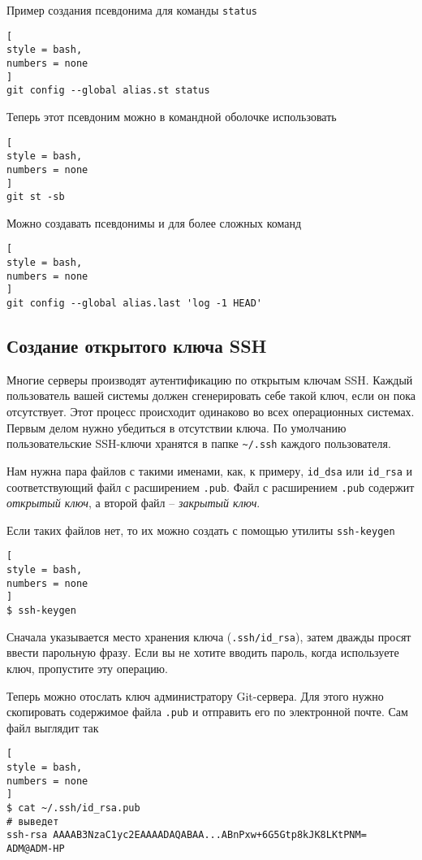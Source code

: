 \documentclass[%
	11pt,
	a4paper,
	utf8,
		]{article}
\begin{document}
Пример создания псевдонима для команды \texttt{status}
\begin{lstlisting}[
style = bash,
numbers = none
]
git config --global alias.st status
\end{lstlisting}

Теперь этот псевдоним можно в командной оболочке использовать
\begin{lstlisting}[
style = bash,
numbers = none
]
git st -sb
\end{lstlisting}

Можно создавать псевдонимы и для более сложных команд
\begin{lstlisting}[
style = bash,
numbers = none
]
git config --global alias.last 'log -1 HEAD'
\end{lstlisting}

\subsection{Создание открытого ключа SSH}

Многие серверы производят аутентификацию по открытым ключам SSH. Каждый пользователь вашей системы должен сгенерировать себе такой ключ, если он пока отсутствует. Этот процесс происходит одинаково во всех операционных системах. Первым делом нужно убедиться в отсутствии ключа. По умолчанию пользовательские SSH-ключи хранятся в папке \verb|~/.ssh| каждого пользователя.

Нам нужна пара файлов с такими именами, как, к примеру, \texttt{id\_dsa} или \texttt{id\_rsa} и соответствующий файл с расширением \texttt{.pub}. Файл с расширением \texttt{.pub} содержит \emph{открытый ключ}, а второй файл -- \emph{закрытый ключ}.

Если таких файлов нет, то их можно создать с помощью утилиты \texttt{ssh-keygen}
\begin{lstlisting}[
style = bash,
numbers = none
]
$ ssh-keygen
\end{lstlisting}

Сначала указывается место хранения ключа (\texttt{.ssh/id\_rsa}), затем дважды просят ввести парольную фразу. Если вы не хотите вводить пароль, когда используете ключ, пропустите эту операцию.

Теперь можно отослать ключ администратору Git-сервера. Для этого нужно скопировать содержимое файла \texttt{.pub} и отправить его по электронной почте. Сам файл выглядит так
\begin{lstlisting}[
style = bash,
numbers = none
]
$ cat ~/.ssh/id_rsa.pub
# выведет
ssh-rsa AAAAB3NzaC1yc2EAAAADAQABAA...ABnPxw+6G5Gtp8kJK8LKtPNM= ADM@ADM-HP
\end{lstlisting}
\end{document}
